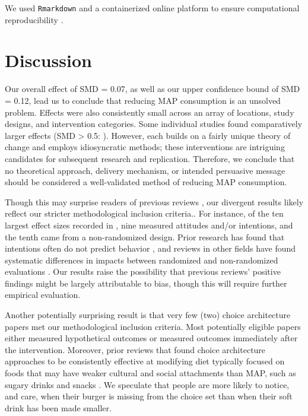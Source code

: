 \documentclass[sn-nature,referee,pdflatex]{sn-jnl}
\begin{document}
We used \texttt{Rmarkdown} \citep{xie2018} and a containerized
\citep{moreau2023} online platform \citep{clyburne2019} to ensure
computational reproducibility \citep{polanin2020}.

\section{Discussion}\label{discussion}

Our overall effect of SMD = 0.07, as well as our upper confidence bound
of SMD = 0.12, lead us to conclude that reducing MAP consumption is an
unsolved problem. Effects were also consistently small across an array
of locations, study designs, and intervention categories. Some
individual studies found comparatively larger effects (SMD
\textgreater{} 0.5:
\citep{carfora2023, merrill2009, kanchanachitra2020, bianchi2022, piester2020}).
However, each builds on a fairly unique theory of change and employs
idiosyncratic methods; these interventions are intriguing candidates for
subsequent research and replication. Therefore, we conclude that no
theoretical approach, delivery mechanism, or intended persuasive message
should be considered a well-validated method of reducing MAP
consumption.

Though this may surprise readers of previous reviews
\citep{mathur2021meta, meier2022, mertens2022}, our divergent results
likely reflect our stricter methodological inclusion criteria.. For
instance, of the ten largest effect sizes recorded in
\citep{mathur2021effectiveness}, nine measured attitudes and/or
intentions, and the tenth came from a non-randomized design. Prior
research has found that intentions often do not predict behavior
\citep{mathur2021effectiveness}, and reviews in other fields have found
systematic differences in impacts between randomized and non-randomized
evaluations \citep{porat2024, stevenson2023}. Our results raise the
possibility that previous reviews' positive findings might be largely
attributable to bias, though this will require further empirical
evaluation.

Another potentially surprising result is that very few (two) choice
architecture papers met our methodological inclusion criteria. Most
potentially eligible papers either measured hypothetical outcomes or
measured outcomes immediately after the intervention. Moreover, prior
reviews that found choice architecture approaches to be consistently
effective at modifying diet typically focused on foods that may have
weaker cultural and social attachments than MAP, such as sugary drinks
and snacks \citep{venema2020, adriaanse2009}. We speculate that people
are more likely to notice, and care, when their burger is missing from
the choice set than when their soft drink has been made smaller.
\end{document}
